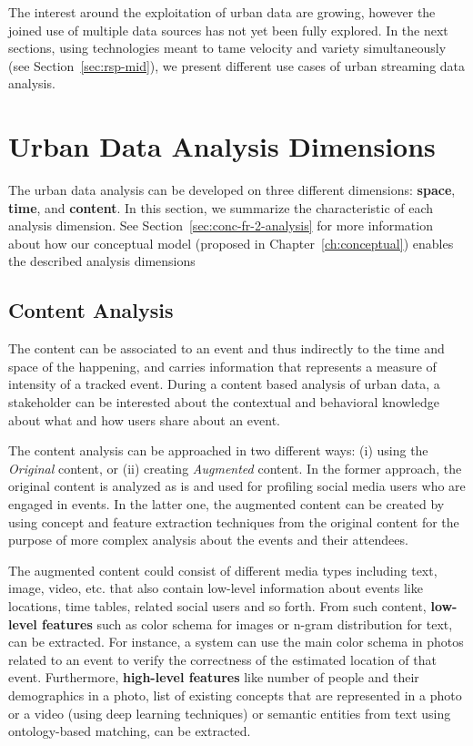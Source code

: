 The interest around the exploitation  of urban data are growing, however the joined use of multiple data sources has not yet been fully explored.
In the next sections, using technologies meant to tame velocity and variety simultaneously (see Section~\ref{sec:rsp-mid}), we present different use cases of urban streaming data analysis.

\section{Urban Data Analysis Dimensions} \label{sec:uda-analysis}
The urban data analysis can be developed on three different dimensions: \textbf{space}, \textbf{time}, and \textbf{content}. In this section, we summarize the characteristic of each analysis dimension. See Section~\ref{sec:conc-fr-2-analysis} for more information about how our conceptual model (proposed in Chapter~\ref{ch:conceptual}) enables the described analysis dimensions

\subsection{Content Analysis}
The content can be associated to an event and thus indirectly to the time and space of the happening, and carries information that represents a measure of intensity of a tracked event.
During a content based analysis of urban data, a stakeholder can be interested about the contextual and behavioral knowledge about what and how users share about an event. 

The content analysis can be approached in two different ways: (i) using the \textit{Original} content, or (ii) creating \textit{Augmented} content.
In the former approach, the original content is analyzed as is and used for profiling social media users who are engaged in events. In the latter one, the augmented content can be created by using concept and feature extraction techniques from the original content for the purpose of more complex analysis about the events and their attendees.

The augmented content could consist of different media types including text, image, video, etc. that also contain low-level information about events like locations, time tables, related social users and so forth. From such content, \textbf{low-level features} such as color schema for images or n-gram distribution for text, can be extracted. For instance, a system can use the main color schema in photos related to an event to verify the correctness of the estimated location of that event. Furthermore, \textbf{high-level features} like number of people and their demographics in a photo, list of existing concepts that are represented in a photo or a video (using deep learning techniques) or semantic entities from text using ontology-based matching, can be extracted.

